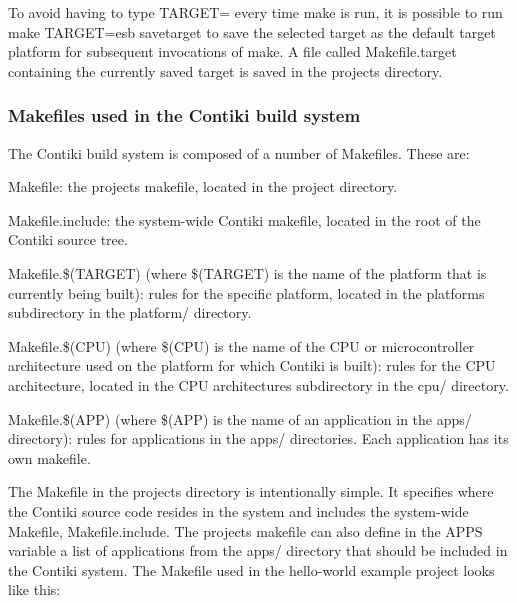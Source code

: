 To avoid having to type {\ttfamily T\+A\+R\+G\+ET=} every time {\ttfamily make} is run, it is possible to run {\ttfamily make T\+A\+R\+G\+ET=esb savetarget} to save the selected target as the default target platform for subsequent invocations of {\ttfamily make}. A file called {\ttfamily Makefile.\+target} containing the currently saved target is saved in the project\textquotesingle{}s directory.\hypertarget{a00058_buildsystem-makefiles}{}\subsubsection{Makefiles used in the Contiki build system}\label{a00058_buildsystem-makefiles}
The Contiki build system is composed of a number of Makefiles. These are\+:
\begin{DoxyItemize}
\item {\ttfamily Makefile}\+: the project\textquotesingle{}s makefile, located in the project directory.
\item {\ttfamily Makefile.\+include}\+: the system-\/wide Contiki makefile, located in the root of the Contiki source tree.
\item {\ttfamily Makefile.\$(T\+A\+R\+G\+ET)} (where \$(T\+A\+R\+G\+ET) is the name of the platform that is currently being built)\+: rules for the specific platform, located in the platform\textquotesingle{}s subdirectory in the platform/ directory.
\item {\ttfamily Makefile.\$(C\+PU)} (where \$(C\+PU) is the name of the C\+PU or microcontroller architecture used on the platform for which Contiki is built)\+: rules for the C\+PU architecture, located in the C\+PU architecture\textquotesingle{}s subdirectory in the cpu/ directory.
\item {\ttfamily Makefile.\$(A\+PP)} (where \$(A\+PP) is the name of an application in the apps/ directory)\+: rules for applications in the apps/ directories. Each application has its own makefile.
\end{DoxyItemize}

The Makefile in the project\textquotesingle{}s directory is intentionally simple. It specifies where the Contiki source code resides in the system and includes the system-\/wide Makefile, {\ttfamily Makefile.\+include}. The project\textquotesingle{}s makefile can also define in the {\ttfamily A\+P\+PS} variable a list of applications from the apps/ directory that should be included in the Contiki system. The Makefile used in the hello-\/world example project looks like this\+:


